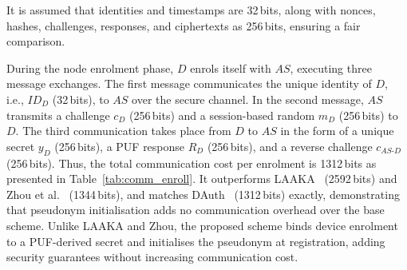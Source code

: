 \documentclass[conference]{IEEEtran}
\begin{document}
It is assumed that identities and timestamps are 32\,bits, along with nonces, hashes,
challenges, responses, and ciphertexts as 256\,bits, ensuring a fair comparison.

During the node enrolment phase, $D$ enrols itself with $AS$, executing three message
exchanges. The first message communicates the unique identity of $D$, i.e., $ID_D$
(32\,bits), to $AS$ over the secure channel. In the second message, $AS$ transmits a
challenge $c_D$ (256\,bits) and a session-based random $m_D$ (256\,bits) to $D$. The
third communication takes place from $D$ to $AS$ in the form of a unique secret $y_D$
(256\,bits), a PUF response $R_D$ (256\,bits), and a reverse challenge
$c_{AS\text{-}D}$ (256\,bits). Thus, the total communication cost per enrolment is
1312\,bits as presented in Table~\ref{tab:comm_enroll}. It outperforms
LAAKA~\cite{ali2024laaka} (2592\,bits) and Zhou et al.~\cite{zhou2024auth}
(1344\,bits), and matches DAuth~\cite{das2026comsnets} (1312\,bits) exactly, demonstrating
that pseudonym initialisation adds no communication overhead over the base scheme. Unlike
LAAKA and Zhou, the proposed scheme binds device enrolment to a PUF-derived secret and
initialises the pseudonym at registration, adding security guarantees without increasing
communication cost.
\end{document}
